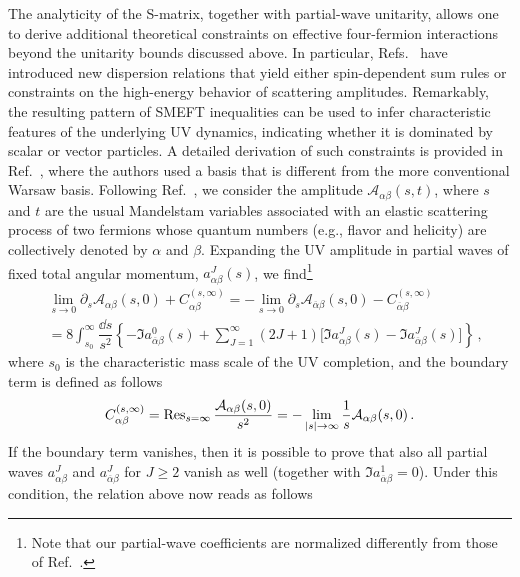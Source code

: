 \documentclass[a4paper,11pt]{article}
\begin{document}
The analyticity of the S-matrix, together with partial-wave unitarity, allows one to derive additional theoretical constraints on effective four-fermion interactions beyond the unitarity bounds discussed above. In particular, Refs.~\cite{Low:2009di,Azatov:2021ygj,Gu:2020thj,Remmen:2020uze,Remmen:2022orj,Altmannshofer:2023bfk,Altmannshofer:2025lun} have introduced new dispersion relations that yield either spin-dependent sum rules or constraints on the high-energy behavior of scattering amplitudes. Remarkably, the resulting pattern of SMEFT inequalities can be used to infer characteristic features of the underlying UV dynamics, indicating whether it is dominated by scalar or vector particles. A detailed derivation of such constraints is provided in Ref.~\cite{Remmen:2020uze}, where the authors used a basis that is different from the more conventional Warsaw basis. Following Ref.~\cite{Remmen:2020uze}, we consider the amplitude $\mathcal{A}_{\alpha\beta}(s,t)$, where $s$ and $t$ are the usual Mandelstam variables associated with an elastic scattering process of
two fermions whose quantum numbers (e.g., flavor and helicity) are collectively denoted by $\alpha$ and $\beta$.
Expanding the UV amplitude in partial waves of fixed total angular momentum, $a_{\alpha\beta}^{J}(s)$, we find\footnote{Note that our partial-wave coefficients are normalized differently from those of Ref.~\cite{Remmen:2020uze}.}
\begin{equation}
    \begin{split}
        &\lim_{s\rightarrow 0}\partial_s\mathcal{A}_{\alpha\beta}(s,0)+C_{\alpha\beta}^{(s,\infty)}=-\lim_{s\rightarrow 0}\partial_s\mathcal{A}_{\overline \alpha\beta}(s,0)-C_{   \overline\alpha\beta}^{(s,\infty)} \\
        &=8\int_{s_0}^\infty \dfrac{\dd s}{s^2}\left\{-\Im a_{\overline{\alpha}\beta}^{0}(s)+\sum_{J=1}^\infty(2J+1)\Big[\Im a_{\alpha\beta}^{J}(s)-\Im a_{\overline{\alpha}\beta}^{J}(s)\Big]\right\}\,,
    \end{split}
\end{equation}
where $s_0$ is the characteristic mass scale of the UV completion, and the boundary term is defined as follows
\begin{equation}
    C_{\alpha\beta}^{(s,\infty)}=\Res_{s=\infty}\frac{\mathcal{A}_{\alpha\beta}(s,0)}{s^2}=-\lim_{|s|\to \infty}\dfrac{1}{s}\mathcal{A}_{\alpha\beta}(s,0)\,.
\end{equation}
If the boundary term vanishes, then it is possible to prove that also all partial waves $a_{\alpha\beta}^{J}$ and $a_{\overline\alpha\beta}^{J}$ for $J\geq2$ vanish as well (together with $\Im a_{\overline\alpha\beta}^{1}=0$). Under this condition, the relation above now reads as follows \cite{Remmen:2020uze}
\end{document}
